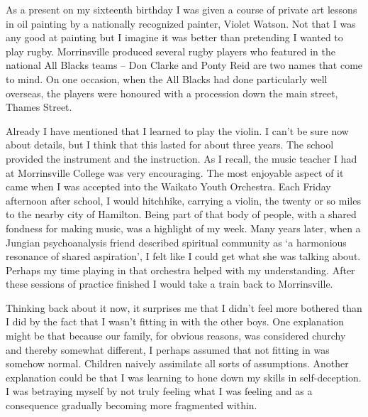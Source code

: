 As a present on my sixteenth birthday I was given a course of private
art lessons in oil painting by a nationally recognized painter, Violet
Watson. Not that I was any good at painting but I imagine it was better
than pretending I wanted to play rugby. Morrinsville produced several
rugby players who featured in the national All Blacks teams -- Don
Clarke and Ponty Reid are two names that come to mind. On one occasion,
when the All Blacks had done particularly well overseas, the players
were honoured with a procession down the main street, Thames Street.

Already I have mentioned that I learned to play the violin. I can't be
sure now about details, but I think that this lasted for about three
years. The school provided the instrument and the instruction. As I
recall, the music teacher I had at Morrinsville College was very encouraging.
The most enjoyable aspect of it came when I was accepted into the
Waikato Youth Orchestra. Each Friday afternoon after school, I would
hitchhike, carrying a violin, the twenty or so miles to the nearby city
of Hamilton. Being part of that body of people, with a shared fondness
for making music, was a highlight of my week. Many years later, when a
Jungian psychoanalysis friend described spiritual community as `a
harmonious resonance of shared aspiration', I felt like I could get what
she was talking about. Perhaps my time playing in that orchestra helped
with my understanding. After these sessions of practice finished I would
take a train back to Morrinsville.

Thinking back about it now, it surprises me that I didn't feel more
bothered than I did by the fact that I wasn't fitting in with the other
boys. One explanation might be that because our family, for obvious
reasons, was considered churchy and thereby somewhat different, I
perhaps assumed that not fitting in was somehow normal. Children naively
assimilate all sorts of assumptions. Another explanation could be that I
was learning to hone down my skills in self-deception. I was betraying
myself by not truly feeling what I was feeling and as a consequence
gradually becoming more fragmented within.


